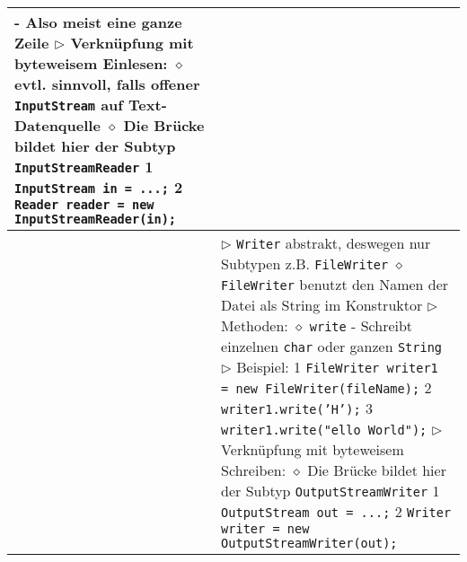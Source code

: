 \begin{longtable}{ | p{} p{} | }
{	\hspace{0.6cm} - Also meist eine ganze Zeile \\
	$\triangleright$ Verknüpfung mit byteweisem Einlesen: \\
	\hspace{0.4cm} $\diamond$ evtl. sinnvoll, falls offener \texttt{InputStream} auf Text-Datenquelle \\
	\hspace{0.4cm} $\diamond$ Die Brücke bildet hier der Subtyp \texttt{InputStreamReader} \\
	\hspace{0.4cm} 1 \hspace{0.1cm} \texttt{InputStream in = ...;} \\
	\hspace{0.4cm} 2 \hspace{0.1cm} \texttt{Reader reader = new InputStreamReader(in);}} \\ \hline

	\makecell[l]{Textdaten schreiben} & \makecell[l]{
	$\triangleright$ \texttt{Writer} abstrakt, deswegen nur Subtypen z.B. \texttt{FileWriter} \\
	\hspace{0.4cm} $\diamond$ \texttt{FileWriter} benutzt den Namen der Datei als String im Konstruktor \\
	$\triangleright$ Methoden: \\
	\hspace{0.4cm} $\diamond$ \texttt{write} \\
	\hspace{0.6cm} - Schreibt einzelnen \texttt{char} oder ganzen \texttt{String} \\
	$\triangleright$ Beispiel: \\
	\hspace{0.4cm} 1 \hspace{0.1cm} \texttt{FileWriter writer1 = new FileWriter(fileName);} \\
	\hspace{0.4cm} 2 \hspace{0.1cm} \texttt{writer1.write('H');} \\
	\hspace{0.4cm} 3 \hspace{0.1cm} \texttt{writer1.write(\string"ello World\string");} \\ 
	$\triangleright$ Verknüpfung mit byteweisem Schreiben: \\
	\hspace{0.4cm} $\diamond$ Die Brücke bildet hier der Subtyp \texttt{OutputStreamWriter} \\
	\hspace{0.4cm} 1 \hspace{0.1cm} \texttt{OutputStream out = ...;} \\
	\hspace{0.4cm} 2 \hspace{0.1cm} \texttt{Writer writer = new OutputStreamWriter(out);} } \\ \hline

	\end{longtable}


